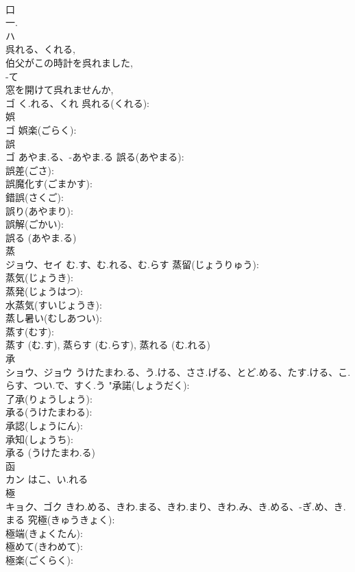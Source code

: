 \documentclass[8pt]{extreport}
\begin{document}
\begin{CJK}{UTF8}{min}
\\	口 
\\	一. 
\\	ハ 
\\	呉れる、くれる, 
\\	伯父がこの時計を呉れました, 
\\	-て 
\\	窓を開けて呉れませんか, 
\\	ゴ	く.れる、くれ	呉れる(くれる): 
\\	娯			
\\	ゴ		娯楽(ごらく): 
\\	誤			
\\	ゴ	あやま.る、-あやま.る	誤る(あやまる): 
\\	誤差(ごさ): 
\\	誤魔化す(ごまかす): 
\\	錯誤(さくご): 
\\	誤り(あやまり): 
\\	誤解(ごかい): 
\\	誤る (あやま.る)
\\	蒸			
\\	ジョウ、セイ	む.す、む.れる、む.らす	蒸留(じょうりゅう): 
\\	蒸気(じょうき): 
\\	蒸発(じょうはつ): 
\\	水蒸気(すいじょうき): 
\\	蒸し暑い(むしあつい): 
\\	蒸す(むす): 
\\	蒸す (む.す), 蒸らす (む.らす), 蒸れる (む.れる)
\\	承			
\\	ショウ、ジョウ	うけたまわ.る、う.ける、ささ.げる、とど.める、たす.ける、こ.らす、つい.で、すく.う	"承諾(しょうだく): 
\\	了承(りょうしょう): 
\\	承る(うけたまわる): 
\\	承認(しょうにん): 
\\	承知(しょうち): 
\\	承る (うけたまわ.る)
\\	函			
\\	カン	はこ、い.れる		
\\	極			
\\	キョク、ゴク	きわ.める、きわ.まる、きわ.まり、きわ.み、き.める、-ぎ.め、き.まる	究極(きゅうきょく): 
\\	極端(きょくたん): 
\\	極めて(きわめて): 
\\	極楽(ごくらく): 

\end{CJK}
\end{document}
